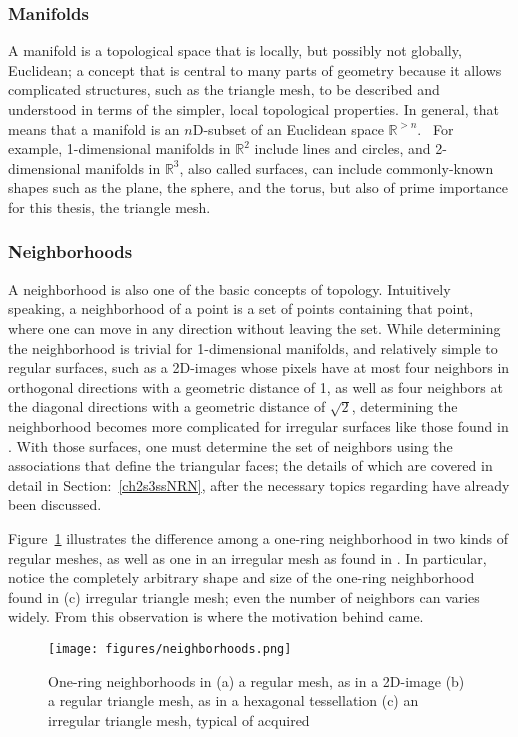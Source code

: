 %
\subsubsection{Manifolds}
A manifold is a topological space that is locally, but possibly not globally, Euclidean; a concept that is central to many parts of geometry because it allows complicated structures, such as the triangle mesh, to be described and understood in terms of the simpler, local topological properties. In general, that means that a manifold is an $n$D-subset of an Euclidean space $\mathbb{R}^{>n}$.~\cite[p.~199]{Mara12} For example, 1-dimensional manifolds in $\mathbb{R}^{2}$ include lines and circles, and 2-dimensional manifolds in $\mathbb{R}^{3}$, also called surfaces, can include commonly-known shapes such as the plane, the sphere, and the torus, but also of prime importance for this thesis, the triangle mesh.

%
\subsubsection{Neighborhoods}
A neighborhood is also one of the basic concepts of topology. Intuitively speaking, a neighborhood of a point is a set of points containing that point, where one can move in any direction without leaving the set. While determining the neighborhood is trivial for 1-dimensional manifolds, and relatively simple to regular surfaces, such as a 2D-images whose pixels have at most four neighbors in orthogonal directions with a geometric distance of 1, as well as four neighbors at the diagonal directions with a geometric distance of $\sqrt{2}$, determining the neighborhood becomes more complicated for irregular surfaces like those found in \tdd{}. With those surfaces, one must determine the set of neighbors using the associations that define the triangular faces; the details of which are covered in detail in Section:~\ref{ch2s3ssNRN}, after the necessary topics regarding \tdd{} have already been discussed.

Figure~\ref{fig:neighborhoods} illustrates the difference among a one-ring neighborhood in two kinds of regular meshes, as well as one in an irregular mesh as found in \tdd{}. In particular, notice the completely arbitrary shape and size of the one-ring neighborhood found in (c) irregular triangle mesh; even the number of neighbors can varies widely. From this observation is where the motivation behind  came.

\begin{figure}
\ffigbox
	{\texttt{[image: figures/neighborhoods.png]}}
	{\caption[One-ring neighborhoods in regular and irregular meshes]{One-ring neighborhoods in (a) a regular mesh, as in a 2D-image (b) a regular triangle mesh, as in a hexagonal tessellation (c) an irregular triangle mesh, typical of acquired \tdd{}}\label{fig:neighborhoods}}
\end{figure}

